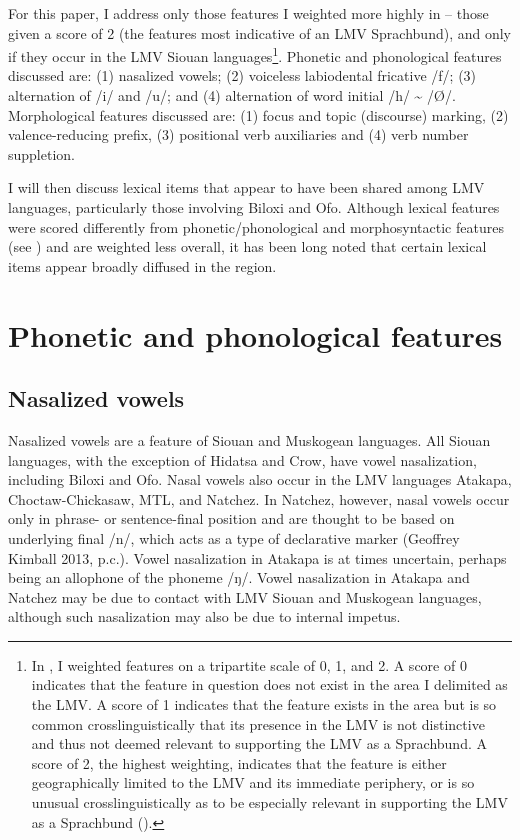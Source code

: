 \documentclass[output=paper]{LSP/langsci}
\begin{document}
For this paper, I address only those features I weighted more highly in \citet{Kaufman2014} -- those given a score of 2 (the features most indicative of an LMV Sprachbund), and only if they occur in the LMV Siouan languages\footnote{In \citet{Kaufman2014}, I weighted features on a tripartite scale of 0, 1, and 2. A score of 0 indicates that the feature in question does not exist in the area I delimited as the LMV. A score of 1 indicates that the feature exists in the area but is so common crosslinguistically that its presence in the LMV is not distinctive and thus not deemed relevant to supporting the LMV as a Sprachbund. A score of 2, the highest weighting, indicates that the feature is either geographically limited to the LMV and its immediate periphery, or is so unusual crosslinguistically as to be especially relevant in supporting the LMV as a Sprachbund (\citealt{Kaufman2014}).}. Phonetic and phonological features discussed are: (1) nasalized vowels; (2) voiceless labiodental fricative /f/; (3) alternation of /i/ and /u/; and (4) alternation of word initial /h/ \textasciitilde{} /Ø/. Morphological features discussed are: (1) focus and topic (discourse) marking, (2) valence-reducing prefix, (3) positional verb auxiliaries and (4) verb number suppletion. 

I will then discuss lexical items that appear to have been shared among LMV languages, particularly those involving Biloxi and Ofo. Although lexical features were scored differently from phonetic/phonological and morphosyntactic features (see \citealt{Kaufman2014}) and are weighted less overall, it has been long noted that certain lexical items appear broadly diffused in the region. 

\section{Phonetic and phonological features}

\subsection{Nasalized vowels}

Nasalized vowels are a feature of Siouan and Muskogean languages. All Siouan languages, with the exception of Hidatsa and Crow, have vowel nasalization, including Biloxi and Ofo. Nasal vowels also occur in the LMV languages Atakapa, Choctaw-Chickasaw, MTL, and Natchez. In Natchez, however, nasal vowels occur only in phrase- or sentence-final position and are thought to be based on underlying final /n/, which acts as a type of declarative marker (Geoffrey Kimball 2013, p.c.). Vowel nasalization in Atakapa is at times uncertain, perhaps being an allophone of the phoneme /ŋ/. Vowel nasalization in Atakapa and Natchez may be due to contact with LMV Siouan and Muskogean languages, although such nasalization may also be due to internal impetus.
\end{document}
